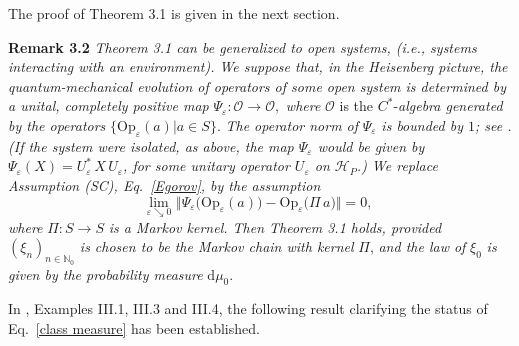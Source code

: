 \documentclass[11pt]{article}
\begin{document}
The proof of Theorem 3.1 is given in the next section.

\vspace{0.15cm}\noindent
{\bf{Remark 3.2}} \textit{Theorem 3.1 can be generalized to open systems, (i.e., systems interacting with an environment).
We suppose that, in the Heisenberg picture, the quantum-mechanical evolution of operators of some open system 
is determined by a unital, completely positive map} \mbox{$\Psi_{\varepsilon} : \mathcal{O} \rightarrow \mathcal{O},$}
\textit{where} $\mathcal{O}$ is the $C^{*}$-\textit{algebra  generated by the operators} 
$\big\{\text{Op}_{\varepsilon}(a)\big| a\in S\big\}$.
\textit{The operator norm of} $\Psi_{\varepsilon}$ \textit{is bounded by $1$; see \cite{RD}. (If the system were isolated, 
as above, the map $\Psi_{\varepsilon}$ would be given by $\Psi_{\varepsilon}(X)=U_{\varepsilon}^{*} \,X\, U_{\varepsilon}$, 
for some unitary operator $U_{\varepsilon}$ on $\mathcal{H}_P$.) We replace Assumption (SC), Eq.~\eqref{Egorov}, 
by the assumption}
$$\underset{\varepsilon \searrow 0}{\text{lim}}\,\, \Vert \Psi_{\varepsilon} \big(\text{Op}_{\varepsilon} (a)\big) - 
\text{Op}_{\varepsilon}\big(\Pi \,a\big) \Vert =0,$$
\textit{where} $\Pi: S\rightarrow S$ \textit{is a Markov kernel. Then Theorem 3.1 holds, provided}
 $(\xi_n)_{n \in \mathbb{N}_0}$ \textit{is chosen to be the Markov chain with kernel} $\Pi$, \textit{and the law of} 
 $\xi_0$ \textit{is given by the probability measure} $\text{d}\mu_0$.


\vspace{0.15cm}
In \cite{L-P}, Examples III.1, III.3 and III.4, the following result clarifying the status of Eq.~\eqref{class measure} has been established.
\end{document}
